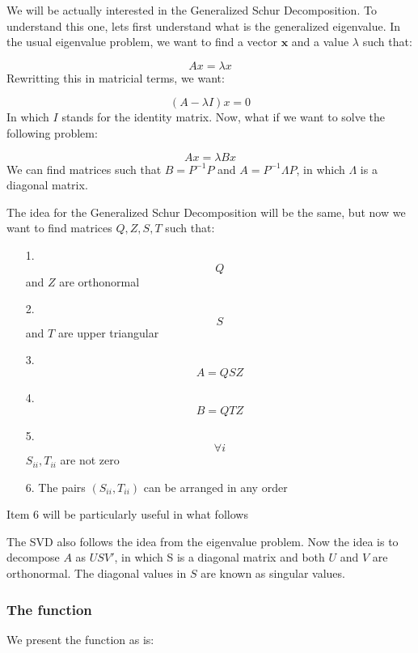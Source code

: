 \documentclass[12pt,a4paper]{article}
\begin{document}
We will be actually interested in the Generalized Schur Decomposition. To understand this one, lets first understand what is the generalized eigenvalue. In the usual eigenvalue problem, we want to find a vector $\mathbf{x}$ and a value $\lambda$ such that:

\[
Ax = \lambda x
\]
Rewritting this in matricial terms, we want:

\[
(A - \lambda I)x = 0
\]
In which $I$ stands for the identity matrix. Now, what if we want to solve the following problem:

\[
Ax = \lambda{}Bx
\]
We can find matrices such that $B = P^{-1}P$ and $A = P^{-1}\Lambda{}P$, in which $\Lambda$ is a diagonal matrix.

The idea for the Generalized Schur Decomposition will be the same, but now we want to find matrices $Q,Z,S,T$ such that:

\begin{itemize}
\item[1. ] \[
Q
\]
and $Z$ are orthonormal


\item[2. ] \[
S
\]
and $T$ are upper triangular


\item[3. ] \[
A = QSZ
\]

\item[4. ] \[
B = QTZ
\]

\item[5. ] \[
\forall i
\]
$S_{ii}, T_{ii}$ are not zero


\item[6. ] The pairs $(S_{ii}, T_{ii})$ can be arranged in any order

\end{itemize}
Item 6 will be particularly useful in what follows

The SVD also follows the idea from the eigenvalue problem. Now the idea is to decompose $A$ as $USV'$, in which S is a diagonal matrix and both $U$ and $V$ are orthonormal. The diagonal values in $S$ are known as singular values.

\subsubsection{The function}
We present the function as is:
\end{document}
